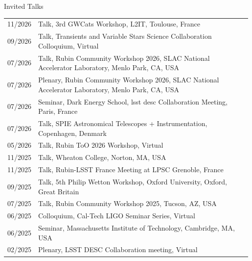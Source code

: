 \begin{rSection}{Invited Talks}
\setlength{\extrarowheight}{3pt}
    \begin{longtable}{p{0.1\linewidth}p{0.89\linewidth}}
    11/2026 & Talk, 3rd GWCats Workshop, L2IT, Toulouse, France\\
    09/2026 & Talk, Transients and Variable Stars Science Collaboration Colloquium, Virtual\\
    07/2026 & Talk, Rubin Community Workshop 2026, SLAC National Accelerator Laboratory, Menlo Park, CA, USA\\
    07/2026 & Plenary, Rubin Community Workshop 2026, SLAC National Accelerator Laboratory, Menlo Park, CA, USA\\
    07/2026 & Seminar, Dark Energy School, \ac{lsst} \ac{desc} Collaboration Meeting, Paris, France\\
    07/2026 & Talk, SPIE Astronomical Telescopes + Instrumentation, Copenhagen, Denmark\\
    05/2026 & Talk, Rubin ToO 2026 Workshop, Virtual\\
    11/2025 & Talk, Wheaton College, Norton, MA, USA\\
    11/2025 & Talk, Rubin-LSST France Meeting at LPSC Grenoble, France\\
    09/2025 & Talk, 5th Philip Wetton Workshop, Oxford University, Oxford, Great Britain\\
    07/2025 & Talk, Rubin Community Workshop 2025, Tucson, AZ, USA\\
    06/2025 & Colloquium, Cal-Tech LIGO Seminar Series, Virtual\\
    06/2025 & Seminar, Massachusetts Institute of Technology, Cambridge, MA, USA\\
    02/2025 & Plenary, LSST DESC Collaboration meeting, Virtual\\
    \end{longtable}

\end{rSection}
